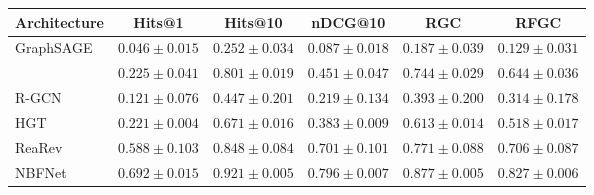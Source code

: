 \begingroup
\small
\setlength{\tabcolsep}{4pt}
\begin{tabular}{@{}lccccc@{}}
\toprule
Architecture & Hits@1 & Hits@10 & nDCG@10 & RGC & RFGC \\
\midrule
GraphSAGE & $0.046\pm0.015$ & $0.252\pm0.034$ & $0.087\pm0.018$ & $0.187\pm0.039$ & $0.129\pm0.031$ \\
\method{} & $0.225\pm0.041$ & $0.801\pm0.019$ & $0.451\pm0.047$ & $0.744\pm0.029$ & $0.644\pm0.036$ \\
R-GCN & $0.121\pm0.076$ & $0.447\pm0.201$ & $0.219\pm0.134$ & $0.393\pm0.200$ & $0.314\pm0.178$ \\
HGT & $0.221\pm0.004$ & $0.671\pm0.016$ & $0.383\pm0.009$ & $0.613\pm0.014$ & $0.518\pm0.017$ \\
ReaRev & $0.588\pm0.103$ & $0.848\pm0.084$ & $0.701\pm0.101$ & $0.771\pm0.088$ & $0.706\pm0.087$ \\
NBFNet & $\mathbf{0.692\pm0.015}$ & $\mathbf{0.921\pm0.005}$ & $\mathbf{0.796\pm0.007}$ & $\mathbf{0.877\pm0.005}$ & $\mathbf{0.827\pm0.006}$ \\
\bottomrule
\end{tabular}
\endgroup
